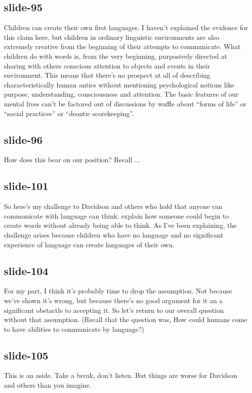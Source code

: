 \documentclass[12pt,\papersize]{extarticle}
\begin{document}
 
\subsection{slide-95}
Children can create their own first languages.
I haven't explained the evidence for this claim here, but children in ordinary linguistic environments are also extremely creative from the beginning of their attempts to communicate.
What children do with words is, from the very beginning, purposively directed at sharing with others conscious attention to objects and events in their environment.
This means that there's no prospect at all of describing characteristically human antics without mentioning psychological notions like purpose, understanding, consciousness and attention.
The basic features of our mental lives can't be factored out of discussions by waffle about “forms of life” or “social practices” or “deontic scorekeeping”.
 
 
\subsection{slide-96}
How does this bear on our position? Recall ...
 
 
\subsection{slide-101}
So here's my challenge to Davidson and others who hold that anyone can communicate with language can think:
explain how someone could begin to create words without already being able to think.
As I've been explaining, the challenge arises because children who have no language and no significant experience of language can create languages of their own.
 
 
\subsection{slide-104}
For my part, I think it's probably time to drop the assumption.
Not because we've shown it's wrong, but because there's no good argument for it an a significant obstactle to accepting it.
So let's return to our overall question without that assumption.
(Recall that the question was, How could humans come to have abilities to communicate by language?)
 
 
\subsection{slide-105}
This is an aside. Take a break, don't listen. But things are worse for Davidson and others than you imagine.
 
\end{document}

